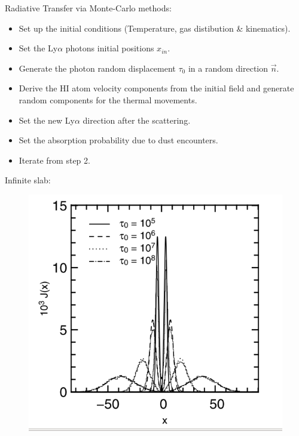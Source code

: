 \documentclass{beamer}
\begin{document}
\begin{frame}{Radiative Transfer via Monte-Carlo methods:}
\begin{itemize}
\item Set up the initial conditions (Temperature, gas distibution \& kinematics).
\item Set the Ly$\alpha$ photons initial positions $x_{in}$.
\item Generate the photon random displacement $\tau_0$ in a random direction
$\vec{n}$.
\item Derive the HI atom velocity components from the initial field and
generate random components for the thermal movements.
\item Set the new Ly$\alpha$ direction after the scattering.
\item Set the absorption probability due to dust encounters.
\item Iterate from step 2.
\end{itemize}
\end{frame}



\begin{frame}{Infinite slab:}
\begin{figure}
\includegraphics[scale=0.4]{Figures/slab.png}
\end{figure}
\end{frame}
\end{document}
